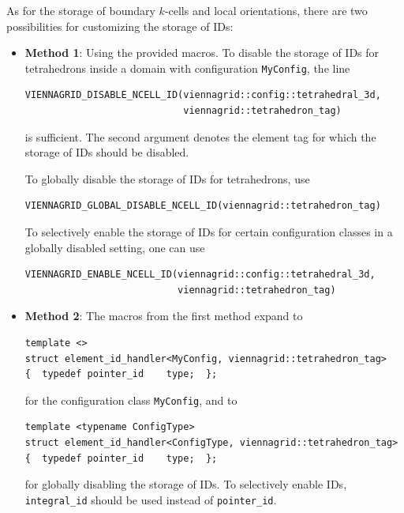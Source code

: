 \begin{itemize}
As for the storage of boundary $k$-cells and local orientations, there are two possibilities for customizing the storage of IDs:
\begin{itemize}
 \item \textbf{Method 1}: Using the provided macros. To disable the storage of IDs for tetrahedrons inside a domain with configuration \lstinline|MyConfig|, the line
 \begin{lstlisting}
VIENNAGRID_DISABLE_NCELL_ID(viennagrid::config::tetrahedral_3d,
                            viennagrid::tetrahedron_tag)
 \end{lstlisting}
 is sufficient. The second argument denotes the element tag for which the storage of IDs should be disabled.

 To globally disable the storage of IDs for tetrahedrons, use
 \begin{lstlisting}
VIENNAGRID_GLOBAL_DISABLE_NCELL_ID(viennagrid::tetrahedron_tag)
 \end{lstlisting}
 To selectively enable the storage of IDs for certain configuration classes in a globally disabled setting, one can use
 \begin{lstlisting}
VIENNAGRID_ENABLE_NCELL_ID(viennagrid::config::tetrahedral_3d,
                           viennagrid::tetrahedron_tag)
 \end{lstlisting}

 \item \textbf{Method 2}:
The macros from the first method expand to
\begin{lstlisting}
template <>
struct element_id_handler<MyConfig, viennagrid::tetrahedron_tag>
{  typedef pointer_id    type;  };
\end{lstlisting}
for the configuration class \lstinline|MyConfig|, and to
\begin{lstlisting}
template <typename ConfigType>
struct element_id_handler<ConfigType, viennagrid::tetrahedron_tag>
{  typedef pointer_id    type;  };
\end{lstlisting}
for globally disabling the storage of IDs. To selectively enable IDs, \lstinline|integral_id| should be used instead of \lstinline|pointer_id|.


\end{itemize}





\end{itemize}


